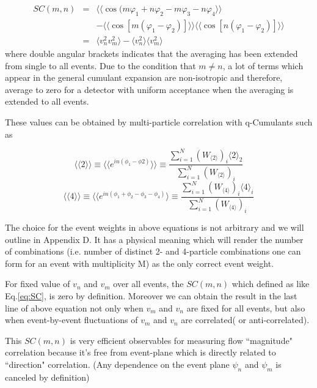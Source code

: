 \begin{eqnarray}
	SC(m,n) &=&  \langle\langle \cos(m\varphi_1 + n\varphi_2 - m\varphi_3 - n\varphi_4 \rangle \rangle \nonumber \\ 
		&&- \langle \langle \cos{[m(\varphi_1 - \varphi_2)]} \rangle \rangle \langle \langle \cos{[n(\varphi_1 - \varphi_2)]} \rangle \rangle  \\ 
	  &=& \langle v_n^2 v_m^2 \rangle - \langle v_n^2 \rangle \langle v_m^2 \rangle \label{eq:SC}
\end{eqnarray}
\smallskip
 where double angular brackets indicates that the averaging has been extended from single to all events. Due to the condition that $m \neq n$, a lot of terms which appear in the general cumulant expansion are non-isotropic and  therefore, average to zero for a detector with uniform acceptance when the averaging is extended to all events. 
 
 
 These values can be obtained by multi-particle correlation with q-Cumulants such as 
 
\begin{equation}
	\langle \langle 2 \rangle \rangle \equiv \langle \langle e^{in(\phi_1 - \phi2)} \rangle \rangle \equiv \frac{\sum_{i=1}^{N}{(W_{\langle 2 \rangle})_i}\langle 2 \rangle_2 }{\sum_{i=1}^{N}{(W_{\langle 2 \rangle})_i}}
	\label{eq:2pcorr}
\end{equation}
\begin{equation}
	\langle \langle 4 \rangle \rangle \equiv \langle \langle e^{in(\phi_1 + \phi_2 - \phi_3 - \phi_4)} \rangle \equiv \frac{\sum_{i=1}^{N}{(W_{\langle 4 \rangle })_i}\langle 4 \rangle_i }{\sum_{i=1}^{N}{(W_{\langle 4 \rangle})_i}}
\end{equation}
\smallskip

The choice for the event weights in above equations is not arbitrary and we will outline in Appendix D. It has a physical meaning which will render the number of combinations (i.e. number of distinct 2- and 4-particle combinations one can form for an event with multiplicity M) as the only correct event weight.
 
 For fixed value of $v_n$ and $v_m$ over all events, the $SC(m,n)$ which defined as like Eq.\ref{eq:SC}, is zero by definition. Moreover we can obtain the result in the last line of above equation not only when $v_m$ and $v_n$ are fixed for all events, but also when event-by-event fluctuations of $v_m$ and $v_n$ are correlated( or anti-correlated).
 
This $SC(m,n)$ is very efficient observables for measuring flow ``magnitude" correlation because it's free from event-plane which is directly related to ``direction" correlation. (Any dependence on the event plane $\psi_n$ and $\psi_m$ is canceled by definition) 


